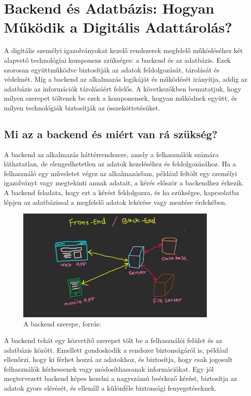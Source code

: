 \documentclass[
]{thesis-ekf}
\theoremstyle{definition}
\theoremstyle{remark}
\begin{document}
	\chapter{Backend és Adatbázis: Hogyan Működik a Digitális Adattárolás?}
	A digitális személyi igazolványokat kezelő rendszerek megfelelő működéséhez két alapvető technológiai komponens szükséges: a backend és az adatbázis. Ezek szorosan együttműködve biztosítják az adatok feldolgozását, tárolását és védelmét. Míg a backend az alkalmazás logikáját és működését irányítja, addig az adatbázis az információk tárolásáért felelős. A következőkben bemutatjuk, hogy milyen szerepet töltenek be ezek a komponensek, hogyan működnek együtt, és milyen technológiák biztosítják az összeköttetésüket.
	
	\section{Mi az a backend és miért van rá szükség?}
	A backend az alkalmazás háttérrendszere, amely a felhasználók számára láthatatlan, de elengedhetetlen az adatok kezeléséhez és feldolgozásához. Ha a felhasználó egy műveletet végez az alkalmazásban, például feltölt egy személyi igazolványt vagy megtekinti annak adatait, a kérés először a backendhez érkezik. A backend feladata, hogy ezt a kérést feldolgozza, és ha szükséges, kapcsolatba lépjen az adatbázissal a megfelelő adatok lekérése vagy mentése érdekében.
	
	\begin{figure}[ht!]
		\centering
		\includegraphics[width=10cm]{backend_database_relationship}
		\caption{A backend szerepe, forrás: \cite{backend}}
		\label{fig-backend}
	\end{figure}
	
	A backend tehát egy közvetítő szerepet tölt be a felhasználói felület és az adatbázis között. Emellett gondoskodik a rendszer biztonságáról is, például ellenőrzi, hogy ki férhet hozzá az adatokhoz, és biztosítja, hogy csak jogosult felhasználók kérhessenek vagy módosíthassanak információkat. Egy jól megtervezett backend képes kezelni a nagyszámú beérkező kérést, biztosítja az adatok gyors elérését, és ellenáll a különféle biztonsági fenyegetéseknek.
	
\end{document}
